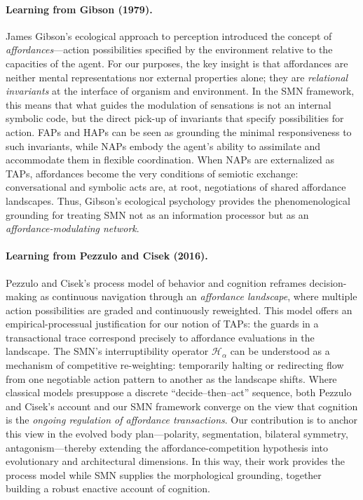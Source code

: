 \paragraph{Learning from Gibson (1979).}
James Gibson’s ecological approach to perception \citep{Gibson1979} introduced the concept of \emph{affordances}—action possibilities specified by the environment relative to the capacities of the agent. 
For our purposes, the key insight is that affordances are neither mental representations nor external properties alone; they are \emph{relational invariants} at the interface of organism and environment. 
In the SMN framework, this means that what guides the modulation of sensations is not an internal symbolic code, but the direct pick-up of invariants that specify possibilities for action. 
FAPs and HAPs can be seen as grounding the minimal responsiveness to such invariants, while NAPs embody the agent’s ability to assimilate and accommodate them in flexible coordination. 
When NAPs are externalized as TAPs, affordances become the very conditions of semiotic exchange: conversational and symbolic acts are, at root, negotiations of shared affordance landscapes. 
Thus, Gibson’s ecological psychology provides the phenomenological grounding for treating SMN not as an information processor but as an \emph{affordance-modulating network}.

\paragraph{Learning from Pezzulo and Cisek (2016).}
Pezzulo and Cisek’s process model of behavior and cognition \citep{PezzuloCisek2016} reframes decision-making as continuous navigation through an \emph{affordance landscape}, where multiple action possibilities are graded and continuously reweighted. 
This model offers an empirical-processual justification for our notion of TAPs: the guards in a transactional trace correspond precisely to affordance evaluations in the landscape. 
The SMN’s interruptibility operator $\mathcal{H}_{\alpha}$ can be understood as a mechanism of competitive re-weighting: temporarily halting or redirecting flow from one negotiable action pattern to another as the landscape shifts. 
Where classical models presuppose a discrete “decide–then–act” sequence, both Pezzulo and Cisek’s account and our SMN framework converge on the view that cognition is the \emph{ongoing regulation of affordance transactions}. 
Our contribution is to anchor this view in the evolved body plan—polarity, segmentation, bilateral symmetry, antagonism—thereby extending the affordance-competition hypothesis into evolutionary and architectural dimensions. 
In this way, their work provides the process model while SMN supplies the morphological grounding, together building a robust enactive account of cognition.
